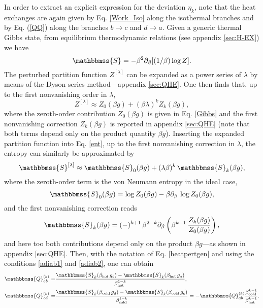 \documentclass[aps,pra,floatfix,twocolumn,groupedaddress,superscriptaddress,nofootinbib,notitlepage,amsmath,amssymb,]{revtex4-1}
\begin{document}
In order to extract an explicit expression for the deviation $\eta_{k}$, note that the heat exchanges are again given by Eq. \eqref{Work_Iso} along the isothermal branches and by Eq. (\ref{QQ}) along the branches $b\rightarrow c$ and $d\rightarrow a$. Given a generic thermal Gibbs state, from equilibrium thermodynamic relations (see appendix \ref{sec:H-EX}) we have
\begin{equation}
\label{ent}
\mathbbmss{S}=-\beta^2\partial_\beta[(1/\beta)\log Z].
\end{equation}
The perturbed partition function $Z^{[\lambda]}$ can be expanded as a power series of $\lambda$ by means of the Dyson series method---appendix \ref{sec:QHE}. One then finds that, up to the first nonvanishing order in $\lambda$, 
\begin{equation}
\label{pertZ}
Z^{[\lambda]} \approx  Z_0(\beta g)+(\beta\lambda)^{k} Z_{k}(\beta g),
\end{equation}
where the zeroth-order contribution $Z_0(\beta g)$ is given in Eq. \eqref{Gibbs} and the first nonvanishing correction $Z_{k}(\beta g)$ is reported in appendix \ref{sec:QHE} (note that both terms depend only on the product quantity $\beta g$). Inserting the expanded partition function into Eq. \eqref{ent}, up to the first nonvanishing correction in $\lambda$, the entropy can similarly be approximated by
\begin{equation}
\label{pertent1}
\mathbbmss{S}^{[\lambda]}\approx  \mathbbmss{S}_0(\beta g)+(\lambda\beta)^{k}\, \mathbbmss{S}_{k}(\beta g),
\end{equation}
where the zeroth-order term is the von Neumann entropy in the ideal case,
\begin{equation}
\label{pertent2}
\mathbbmss{S}_0(\beta g)=\log Z_0(\beta g)-\beta\partial_\beta\,\log Z_0(\beta g),
\end{equation}
and the first nonvanishing correction reads
\begin{equation}
\label{pertent3}
\mathbbmss{S}_{k} (\beta g)=(-)^{k +1}\,\beta^{2-k }\partial_\beta\left(\beta^{k -1}\,\frac{Z_{k}(\beta g)}{Z_0(\beta g)}\right),
\end{equation}
and here too both contributions depend only on the product $\beta g$---as shown in appendix \ref{sec:QHE}. Then, with the notation of Eq. \eqref{heatpertgen} and using the conditions \eqref{adiab1} and \eqref{adiab2}, one can obtain
\begin{align}
\mathbbmss{Q}^{(k )}_{ab}=&\frac{\mathbbmss{S}_{k}(\beta_{\mathrm{hot}}\,g_b) - \mathbbmss{S}_{k}(\beta_{\mathrm{hot}}\,g_a)}{\beta^{1-k}_{\mathrm{hot}}}, \label{pertheatisoth1}\\
\mathbbmss{Q}^{(k )}_{cd}=&\frac{\mathbbmss{S}_{k}(\beta_{\mathrm{cold}} \,g_d)-\mathbbmss{S}_{k}(\beta_{\mathrm{cold}}\, g_c)}{\beta^{1-k}_{\mathrm{cold}}}=
-\mathbbmss{Q}^{(k )}_{ab}\frac{\beta^{k -1}_{\mathrm{cold}}}{\beta^{k -1}_{\mathrm{hot}}}. \label{pertheatisoth2}
\end{align}
\end{document}
